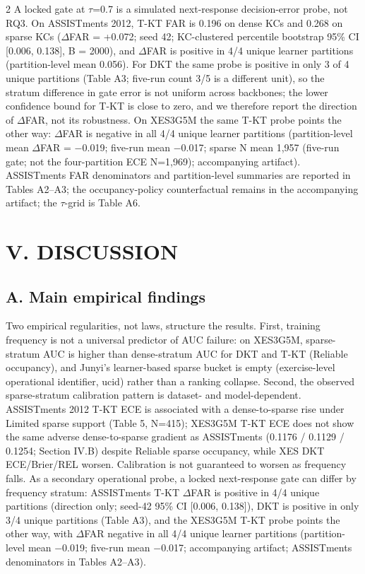 \documentclass[10pt,a4paper]{article}
\begin{document}
\begin{multicols}{2}
 A locked gate at $\tau$=0.7 is a simulated next-response decision-error probe, not RQ3. On ASSISTments 2012, T-KT FAR is 0.196 on dense KCs and 0.268 on sparse KCs ($\Delta$FAR = +0.072; seed 42; KC-clustered percentile bootstrap 95\% CI [0.006, 0.138], B = 2000), and $\Delta$FAR is positive in 4/4 unique learner partitions (partition-level mean 0.056). For DKT the same probe is positive in only 3 of 4 unique partitions (Table A3; five-run count 3/5 is a different unit), so the stratum difference in gate error is not uniform across backbones; the lower confidence bound for T-KT is close to zero, and we therefore report the direction of $\Delta$FAR, not its robustness. On XES3G5M the same T-KT probe points the other way: $\Delta$FAR is negative in all 4/4 unique learner partitions (partition-level mean $\Delta$FAR = $-$0.019; five-run mean $-$0.017; sparse N mean 1,957 (five-run gate; not the four-partition ECE N=1,969); accompanying artifact). ASSISTments FAR denominators and partition-level summaries are reported in Tables A2--A3; the occupancy-policy counterfactual remains in the accompanying artifact; the $\tau$-grid is Table A6.

\columnbreak
\section*{\MakeUppercase{V. DISCUSSION}}

\subsection*{A. Main empirical findings}

Two empirical regularities, not laws, structure the results. First, training frequency is not a universal predictor of AUC failure: on XES3G5M, sparse-stratum AUC is higher than dense-stratum AUC for DKT and T-KT (Reliable occupancy), and Junyi's learner-based sparse bucket is empty (exercise-level operational identifier, ucid) rather than a ranking collapse. Second, the observed sparse-stratum calibration pattern is dataset- and model-dependent. ASSISTments 2012 T-KT ECE is associated with a dense-to-sparse rise under Limited sparse support (Table 5, N=415); XES3G5M T-KT ECE does not show the same adverse dense-to-sparse gradient as ASSISTments (0.1176 / 0.1129 / 0.1254; Section IV.B) despite Reliable sparse occupancy, while XES DKT ECE/Brier/REL worsen. Calibration is not guaranteed to worsen as frequency falls. As a secondary operational probe, a locked next-response gate can differ by frequency stratum: ASSISTments T-KT $\Delta$FAR is positive in 4/4 unique partitions (direction only; seed-42 95\% CI [0.006, 0.138]), DKT is positive in only 3/4 unique partitions (Table A3), and the XES3G5M T-KT probe points the other way, with $\Delta$FAR negative in all 4/4 unique learner partitions (partition-level mean $-$0.019; five-run mean $-$0.017; accompanying artifact; ASSISTments denominators in Tables A2--A3).


\end{multicols}
\end{document}
